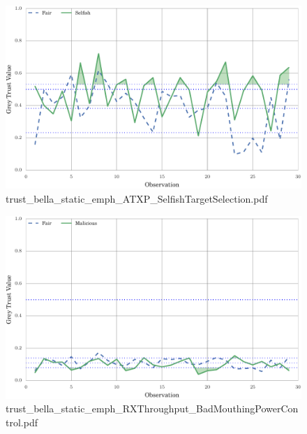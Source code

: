 \documentclass{article}
\begin{document}
\begin{figure}[h!]
\centering
\includegraphics[width=\linewidth]{trust_bella_static_emph_ATXP_SelfishTargetSelection.pdf}
\caption{trust\_bella\_static\_emph\_ATXP\_SelfishTargetSelection.pdf}
\end{figure}




\begin{figure}[h!]
\centering
\includegraphics[width=\linewidth]{trust_bella_static_emph_RXThroughput_BadMouthingPowerControl.pdf}
\caption{trust\_bella\_static\_emph\_RXThroughput\_BadMouthingPowerControl.pdf}
\end{figure}
\end{document}
